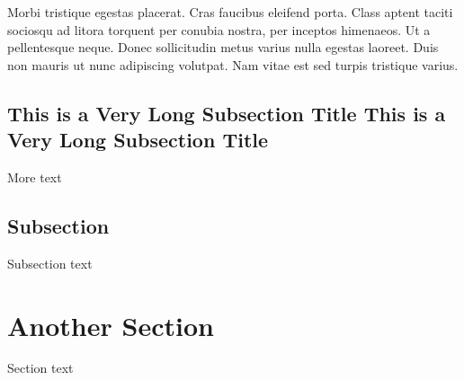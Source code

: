 Morbi tristique egestas placerat. Cras faucibus eleifend porta. Class aptent taciti sociosqu ad litora torquent per conubia nostra, per inceptos himenaeos. Ut a pellentesque neque. Donec sollicitudin metus varius nulla egestas laoreet. Duis non mauris ut nunc adipiscing volutpat. Nam vitae est sed turpis tristique varius. 

\subsection{This is a Very Long Subsection Title This is a Very Long Subsection Title}

More text
\subsection{Subsection}

Subsection text

\section{Another Section}

Section text
